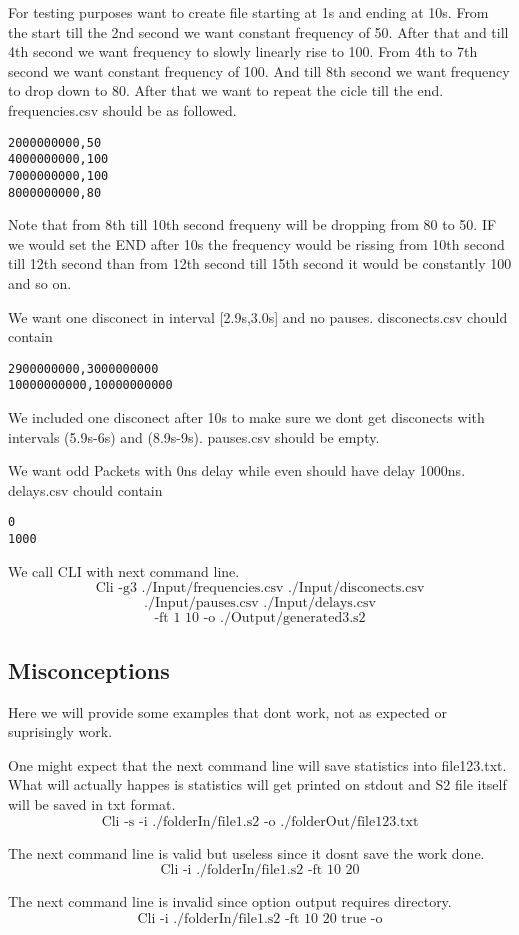 \documentclass[english]{article}
\begin{document}
For testing purposes want to create file starting at 1s and ending at 10s. From the start till the 2nd second we want constant frequency of 50. After that and till 4th second we want frequency to slowly linearly rise to 100. From 4th to 7th second we want constant frequency of 100. And till 8th second we want frequency to drop down to 80. After that we want to repeat the cicle till the end. frequencies.csv should be as followed.
\begin{verbatim}
2000000000,50
4000000000,100
7000000000,100
8000000000,80
\end{verbatim}
Note that from 8th till 10th second frequeny will be dropping from 80 to 50. IF we would set the END after 10s the frequency would be rissing from 10th second till 12th second than from 12th second till 15th second it would be constantly 100 and so on.

We want one disconect in interval [2.9s,3.0s] and no pauses. 
disconects.csv chould contain
\begin{verbatim}
2900000000,3000000000
10000000000,10000000000
\end{verbatim}
We included one disconect after 10s to make sure we dont get disconects with intervals (5.9s-6s) and (8.9s-9s).
pauses.csv should be empty.

We want odd Packets with 0ns delay while even should have delay 1000ns.
delays.csv chould contain
\begin{verbatim}
0
1000
\end{verbatim}
We call CLI with next command line.
$$\text{Cli -g3 ./Input/frequencies.csv ./Input/disconects.csv}$$
$$\text{./Input/pauses.csv ./Input/delays.csv}$$
$$\text{-ft 1 10 -o ./Output/generated3.s2} $$

\subsection{Misconceptions}
Here we will provide some examples that dont work, not as expected or suprisingly work.

One might expect that the next command line will save statistics into file123.txt. What will actually happes is statistics will get printed on stdout and S2 file itself will be saved in txt format.
$$\text{Cli -s -i ./folderIn/file1.s2 -o ./folderOut/file123.txt}$$

The next command line is valid but useless since it dosnt save the work done.
$$\text{Cli -i ./folderIn/file1.s2 -ft 10 20}$$

The next command line is invalid since option output requires directory.
$$\text{Cli -i ./folderIn/file1.s2 -ft 10 20 true -o}$$
\end{document}
